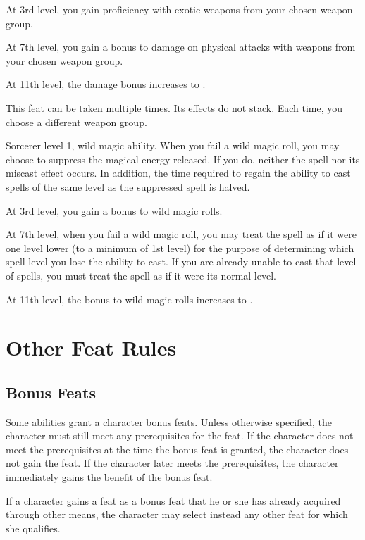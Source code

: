     At 3rd level, you gain proficiency with exotic weapons from your chosen weapon group.

    At 7th level, you gain a  bonus to damage on physical attacks with weapons from your chosen weapon group.

    At 11th level, the damage bonus increases to .

     This feat can be taken multiple times.
    Its effects do not stack.
    Each time, you choose a different weapon group.

    \featpres Sorcerer level 1, wild magic ability.
    \featben When you fail a wild magic roll, you may choose to suppress the magical energy released.
    If you do, neither the spell nor its miscast effect occurs.
    In addition, the time required to regain the ability to cast spells of the same level as the suppressed spell is halved.

    At 3rd level, you gain a  bonus to wild magic rolls.

    At 7th level, when you fail a wild magic roll, you may treat the spell as if it were one level lower (to a minimum of 1st level) for the purpose of determining which spell level you lose the ability to cast.
    If you are already unable to cast that level of spells, you must treat the spell as if it were its normal level.

    At 11th level, the bonus to wild magic rolls increases to .

\section{Other Feat Rules}

    \subsection{Bonus Feats}
        Some abilities grant a character bonus feats.
        Unless otherwise specified, the character must still meet any prerequisites for the feat.
        If the character does not meet the prerequisites at the time the bonus feat is granted, the character does not gain the feat.
        If the character later meets the prerequisites, the character immediately gains the benefit of the bonus feat.

        If a character gains a feat as a bonus feat that he or she has already acquired through other means, the character may select instead any other feat for which she qualifies.


